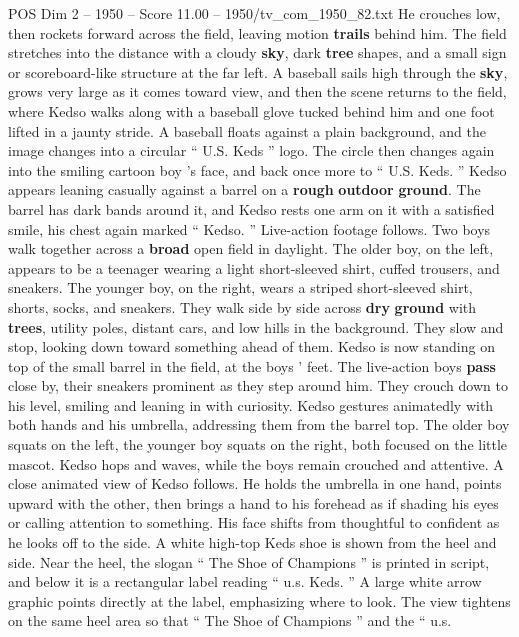 \begin{textsample}{POS Dim 2 – 1950 – Score 11.00 – 1950/tv\_com\_1950\_82.txt}
He crouches low, then rockets forward across the field, leaving motion \textbf{trails} behind him.
The field stretches into the distance with a cloudy \textbf{sky}, dark \textbf{tree} shapes, and a small sign or scoreboard-like structure at the far left.
A baseball sails high through the \textbf{sky}, grows very large as it comes toward view, and then the scene returns to the field, where Kedso walks along with a baseball glove tucked behind him and one foot lifted in a jaunty stride.
A baseball floats against a plain background, and the image changes into a circular “ U.S.
Keds ” logo.
The circle then changes again into the smiling cartoon boy ’s face, and back once more to “ U.S.
Keds. ” Kedso appears leaning casually against a barrel on a \textbf{rough} \textbf{outdoor} \textbf{ground}.
The barrel has dark bands around it, and Kedso rests one arm on it with a satisfied smile, his chest again marked “ Kedso. ” Live-action footage follows.
Two boys walk together across a \textbf{broad} open field in daylight.
The older boy, on the left, appears to be a teenager wearing a light short-sleeved shirt, cuffed trousers, and sneakers.
The younger boy, on the right, wears a striped short-sleeved shirt, shorts, socks, and sneakers.
They walk side by side across \textbf{dry} \textbf{ground} with \textbf{trees}, utility poles, distant cars, and low hills in the background.
They slow and stop, looking down toward something ahead of them.
Kedso is now standing on top of the small barrel in the field, at the boys ’ feet.
The live-action boys \textbf{pass} close by, their sneakers prominent as they step around him.
They crouch down to his level, smiling and leaning in with curiosity.
Kedso gestures animatedly with both hands and his umbrella, addressing them from the barrel top.
The older boy squats on the left, the younger boy squats on the right, both focused on the little mascot.
Kedso hops and waves, while the boys remain crouched and attentive.
A close animated view of Kedso follows.
He holds the umbrella in one hand, points upward with the other, then brings a hand to his forehead as if shading his eyes or calling attention to something.
His face shifts from thoughtful to confident as he looks off to the side.
A white high-top Keds shoe is shown from the heel and side.
Near the heel, the slogan “ The Shoe of Champions ” is printed in script, and below it is a rectangular label reading “ u.s.
Keds. ” A large white arrow graphic points directly at the label, emphasizing where to look.
The view tightens on the same heel area so that “ The Shoe of Champions ” and the “ u.s.

\end{textsample}
